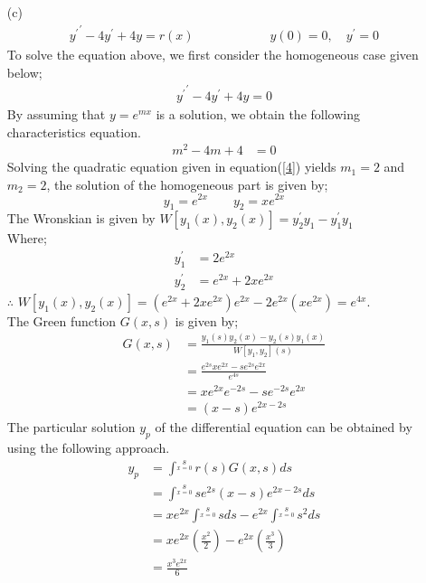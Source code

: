 \documentclass[12pt,a4paper]{article}
\begin{document}
\begin{itemize}
\item[(c)]
\begin{align*}
{y^{\prime}}^{\prime}-4y^{\prime}+4y=r(x) \quad \quad\quad\quad\quad\quad y(0)=0, \quad y^{\prime}=0
\end{align*}
To solve the equation above, we first consider the homogeneous case given below;\\
\begin{align*}
{y^{\prime}}^{\prime}-4y^{\prime}+4y=0
\end{align*}
By assuming that $y=e^{mx}$ is a solution, we obtain the following characteristics equation.
\begin{align}
m^{2}-4m+4&=0 \label{4}
\end{align}
Solving the quadratic equation given in equation(\ref{4}) yields $m_{1}=2$ and $m_{2}=2$, the solution of the homogeneous part is given by;\\
$$ y_{1}=e^{2x} \quad \quad  y_{2}=xe^{2x} $$
The Wronskian is given by $W[y_{1}(x),y_{2}(x)]=y_{2}^{\prime}y_{1}-y_{1}^{\prime}y_{1}$\\
Where;\\
\begin{align*}
y_{1}^{\prime}&=2e^{2x}\\
y_{2}^{\prime}&=e^{2x}+2xe^{2x}
\end{align*}
$\therefore$ $W[y_{1}(x),y_{2}(x)]=(e^{2x}+2xe^{2x})e^{2x}-2e^{2x}(xe^{2x})=e^{4x}$.\\
\newline
The Green function $G(x,s)$ is given by;
\begin{align*}
G(x,s)&=\frac{y_{1}(s)y_{2}(x)-y_{2}(s)y_{1}(x)}{W[y_{1},y_{2}](s)}\\
&=\frac{e^{2s}xe^{2x}-se^{2s}e^{2x}}{e^{4s}}\\
&=xe^{2x}e^{-2s}-se^{-2s}e^{2x}\\
&=(x-s)e^{2x-2s}
\end{align*}
The particular solution $y_{p}$ of the differential equation can be obtained by  using the following approach.
\begin{align*}
y_{p}&=\int ^{s}\limits_{x=0}r(s)G(x,s)ds\\
&=\int ^{s}\limits_{x=0} se^{2s}(x-s)e^{2x-2s}ds\\
&=xe^{2x}\int ^{s}\limits_{x=0}sds- e^{2x}\int ^{s}\limits_{x=0} s^{2}ds\\
&=xe^{2x}(\frac{x^{2}}{2})-e^{2x}(\frac{x^{3}}{3})\\
&=\frac{x^{3}e^{2x}}{6}
\end{align*}
\end{itemize}
\end{document}
